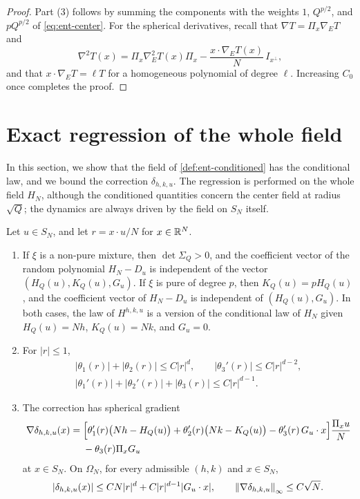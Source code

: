 \begin{proof}
Part (3) follows by summing the components with the weights $1$,
$Q^{p/2}$, and $pQ^{p/2}$ of \eqref{eq:ent-center}. For the spherical
derivatives, recall that $\nabla T=\Pi_x\nabla_ET$ and
\[
 \nabla^2T(x)=\Pi_x\nabla_E^2T(x)\Pi_x
 -\frac{x\cdot\nabla_ET(x)}{N}\,I_{x^\perp},
\]
and that $x\cdot\nabla_ET=\ell T$ for a homogeneous polynomial of
degree $\ell$. Increasing $C_0$ once completes the proof.
\end{proof}

\section{Exact regression of the whole field}\label{sec:ent-regression}

In this section, we show that the field of \cref{def:ent-conditioned} has
the conditional law, and we bound the correction $\delta_{h,k,u}$. The
regression is performed on the whole field $H_N$, although the conditioned
quantities concern the center field at radius $\sqrt Q$; the dynamics are
always driven by the field on $S_N$ itself.

\begin{proposition}\label{prop:ent-regression}
Let $u\in S_N$, and let $r=x\cdot u/N$ for $x\in\mathbb R^N$.
\begin{enumerate}
\item If $\xi$ is a non-pure mixture, then $\det\Sigma_Q>0$, and the
coefficient vector of the random polynomial $H_N-D_u$ is independent of the
vector $(H_Q(u),K_Q(u),G_u)$. If $\xi$ is pure of degree $p$, then
$K_Q(u)=pH_Q(u)$, and the coefficient vector of $H_N-D_u$ is independent of
$(H_Q(u),G_u)$. In both cases, the law of $H^{h,k,u}$ is a version of the
conditional law of $H_N$ given $H_Q(u)=Nh$, $K_Q(u)=Nk$, and $G_u=0$.
\item For $|r|\le1$,
\begin{equation}\label{eq:ent-theta-orders}
 \begin{gathered}
 |\theta_1(r)|+|\theta_2(r)|\le C|r|^d,\qquad
 |\theta_3'(r)|\le C|r|^{d-2},\\
 |\theta_1'(r)|+|\theta_2'(r)|+|\theta_3(r)|\le C|r|^{d-1}.
 \end{gathered}
\end{equation}
\item The correction has spherical gradient
\begin{equation}\label{eq:ent-correction-gradient}
 \begin{split}
 \nabla\delta_{h,k,u}(x)={}&\Bigl[\theta_1'(r)\bigl(Nh-H_Q(u)\bigr)
 +\theta_2'(r)\bigl(Nk-K_Q(u)\bigr)-\theta_3'(r)\,G_u\cdot x\Bigr]
 \frac{\Pi_xu}{N}\\
 &-\theta_3(r)\Pi_xG_u
 \end{split}
\end{equation}
at $x\in S_N$. On $\Omega_N$, for every admissible $(h,k)$ and $x\in S_N$,
\begin{equation}\label{eq:ent-delta-bounds}
 |\delta_{h,k,u}(x)|\le CN|r|^d+C|r|^{d-1}|G_u\cdot x|,
 \qquad
 \left\lVert\nabla\delta_{h,k,u}\right\rVert_\infty\le C\sqrt N .
\end{equation}
\end{enumerate}
\end{proposition}

